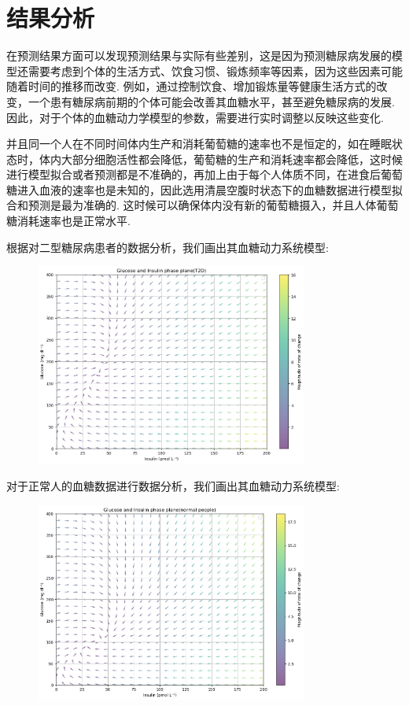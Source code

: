 \chapter{结果分析}

在预测结果方面可以发现预测结果与实际有些差别，这是因为预测糖尿病发展的模型还需要考虑到个体的生活方式、饮食习惯、锻炼频率等因素，因为这些因素可能随着时间的推移而改变. 例如，通过控制饮食、增加锻炼量等健康生活方式的改变，一个患有糖尿病前期的个体可能会改善其血糖水平，甚至避免糖尿病的发展. 因此，对于个体的血糖动力学模型的参数，需要进行实时调整以反映这些变化. 

并且同一个人在不同时间体内生产和消耗葡萄糖的速率也不是恒定的，如在睡眠状态时，体内大部分细胞活性都会降低，葡萄糖的生产和消耗速率都会降低，这时候进行模型拟合或者预测都是不准确的，再加上由于每个人体质不同，在进食后葡萄糖进入血液的速率也是未知的，因此选用清晨空腹时状态下的血糖数据进行模型拟合和预测是最为准确的. 这时候可以确保体内没有新的葡萄糖摄入，并且人体葡萄糖消耗速率也是正常水平. 

根据对二型糖尿病患者的数据分析，我们画出其血糖动力系统模型:
\begin{figure}[H]
    \centering
    \includegraphics[width=0.8\textwidth]{Img/t2dphase.png}
    \label{fig:2type}
\end{figure}

对于正常人的血糖数据进行数据分析，我们画出其血糖动力系统模型:
\begin{figure}[H]
    \centering
    \includegraphics[width=0.8\textwidth]{Img/normalphase.png}
    \label{fig:normal}
\end{figure}

